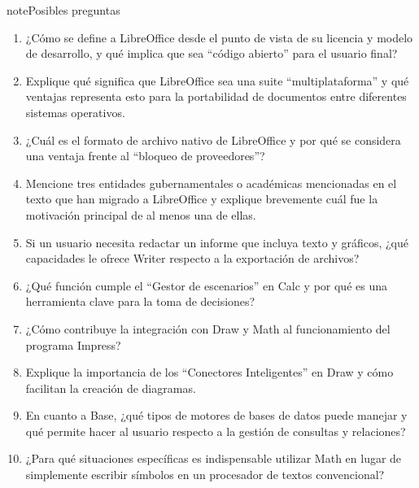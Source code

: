 \documentclass[letterpaper,10pt,spanish]{sphinxmanual}
\begin{document}
\begin{sphinxadmonition}{note}{Posibles preguntas}
\begin{enumerate}
%
\item {} 
\sphinxAtStartPar
¿Cómo se define a LibreOffice desde el punto de vista de su licencia y modelo de desarrollo, y qué implica que sea “código abierto” para el usuario final?

\item {} 
\sphinxAtStartPar
Explique qué significa que LibreOffice sea una suite “multiplataforma” y qué ventajas representa esto para la portabilidad de documentos entre diferentes sistemas operativos.

\item {} 
\sphinxAtStartPar
¿Cuál es el formato de archivo nativo de LibreOffice y por qué se considera una ventaja frente al “bloqueo de proveedores”?

\item {} 
\sphinxAtStartPar
Mencione tres entidades gubernamentales o académicas mencionadas en el texto que han migrado a LibreOffice y explique brevemente cuál fue la motivación principal de al menos una de ellas.

\item {} 
\sphinxAtStartPar
Si un usuario necesita redactar un informe que incluya texto y gráficos, ¿qué capacidades le ofrece Writer respecto a la exportación de archivos?

\item {} 
\sphinxAtStartPar
¿Qué función cumple el “Gestor de escenarios” en Calc y por qué es una herramienta clave para la toma de decisiones?

\item {} 
\sphinxAtStartPar
¿Cómo contribuye la integración con Draw y Math al funcionamiento del programa Impress?

\item {} 
\sphinxAtStartPar
Explique la importancia de los “Conectores Inteligentes” en Draw y cómo facilitan la creación de diagramas.

\item {} 
\sphinxAtStartPar
En cuanto a Base, ¿qué tipos de motores de bases de datos puede manejar y qué permite hacer al usuario respecto a la gestión de consultas y relaciones?

\item {} 
\sphinxAtStartPar
¿Para qué situaciones específicas es indispensable utilizar Math en lugar de simplemente escribir símbolos en un procesador de textos convencional?


\end{enumerate}
\end{sphinxadmonition}
\end{document}
